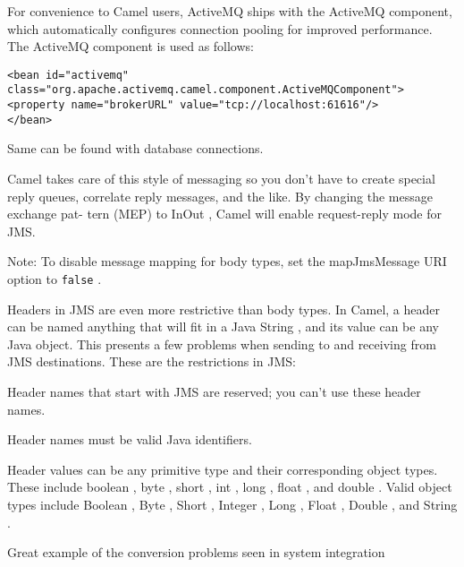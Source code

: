 \documentclass[Screen16to9,17pt]{foils}
\begin{document}
For convenience to Camel users, ActiveMQ ships with the ActiveMQ component, which
automatically configures connection pooling for improved performance. The ActiveMQ
component is used as follows:

\begin{verbatim}
<bean id="activemq"
class="org.apache.activemq.camel.component.ActiveMQComponent">
<property name="brokerURL" value="tcp://localhost:61616"/>
</bean>
\end{verbatim}

Same can be found with database connections.



Camel takes care of this style of messaging so you don’t have to create special reply
queues, correlate reply messages, and the like. By changing the message exchange pat-
tern (MEP) to InOut , Camel will enable request-­reply mode for JMS.





Note: To disable message mapping for body types, set the mapJmsMessage URI option to
\verb+false+ .



Headers in JMS are even more restrictive than body types. In Camel, a header can be
named anything that will fit in a Java String , and its value can be any Java object. This
presents a few problems when sending to and receiving from JMS destinations.
These are the restrictions in JMS:
\begin{list2}
\item Header names that start with JMS are reserved; you can’t use these header names.
\item Header names must be valid Java identifiers.
\item Header values can be any primitive type and their corresponding object
types. These include boolean , byte , short , int , long , float , and double .
Valid object types include Boolean , Byte , Short , Integer , Long , Float , Double ,
and String .
\end{list2}

\vskip 2cm
\centerline{Great example of the conversion problems seen in system integration}
\end{document}
